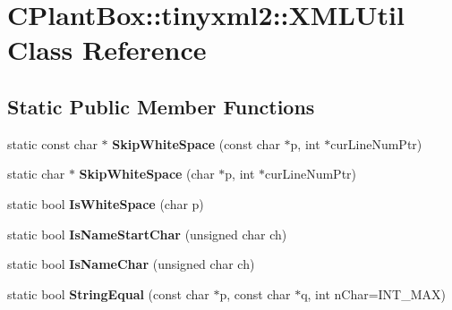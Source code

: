 \hypertarget{classCPlantBox_1_1tinyxml2_1_1XMLUtil}{}\section{C\+Plant\+Box\+:\+:tinyxml2\+:\+:X\+M\+L\+Util Class Reference}
\label{classCPlantBox_1_1tinyxml2_1_1XMLUtil}
\subsection*{Static Public Member Functions}
\begin{DoxyCompactItemize}
\item 
\mbox{\label{classCPlantBox_1_1tinyxml2_1_1XMLUtil_abbc10864d8bc1e014f6960532a075d1e}} 
static const char $\ast$ {\bfseries Skip\+White\+Space} (const char $\ast$p, int $\ast$cur\+Line\+Num\+Ptr)
\item 
\mbox{\label{classCPlantBox_1_1tinyxml2_1_1XMLUtil_aa2bcfa2c6c73820a23eb23372835beaa}} 
static char $\ast$ {\bfseries Skip\+White\+Space} (char $\ast$p, int $\ast$cur\+Line\+Num\+Ptr)
\item 
\mbox{\label{classCPlantBox_1_1tinyxml2_1_1XMLUtil_a23f143eb5941c40dd996061b8a7a2816}} 
static bool {\bfseries Is\+White\+Space} (char p)
\item 
\mbox{\label{classCPlantBox_1_1tinyxml2_1_1XMLUtil_a42837eb06e2f41e133563f35ec29b527}} 
static bool {\bfseries Is\+Name\+Start\+Char} (unsigned char ch)
\item 
\mbox{\label{classCPlantBox_1_1tinyxml2_1_1XMLUtil_a83ebbdbd36c108bb5a721d9ee1bd638a}} 
static bool {\bfseries Is\+Name\+Char} (unsigned char ch)
\item 
\mbox{\label{classCPlantBox_1_1tinyxml2_1_1XMLUtil_a9552633b549ac6040f0c4f9fcef187df}} 
static bool {\bfseries String\+Equal} (const char $\ast$p, const char $\ast$q, int n\+Char=I\+N\+T\+\_\+\+M\+AX)
\item 
\mbox{\label{classCPlantBox_1_1tinyxml2_1_1XMLUtil_acb8539a79d8f57a4e4dac8d059d97f40}} 

\end{DoxyCompactItemize}
